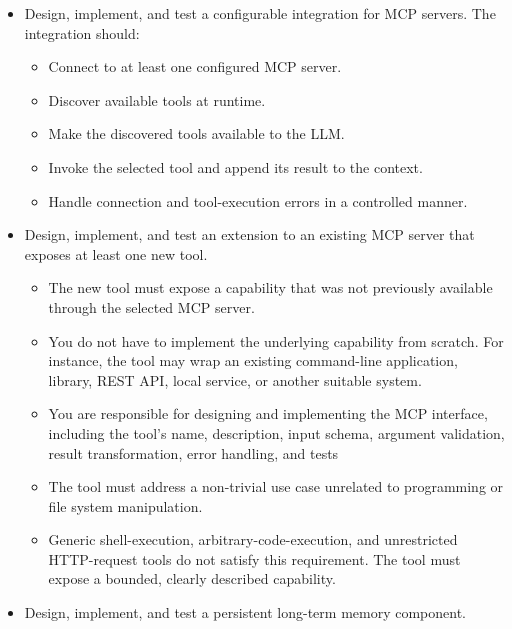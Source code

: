 \documentclass{article}
\begin{document}
\begin{itemize}
    \item Design, implement, and test a configurable integration for MCP servers. The integration should:
    \begin{itemize}
        \item Connect to at least one configured MCP server.
        \item Discover available tools at runtime.
        \item Make the discovered tools available to the LLM.
        \item Invoke the selected tool and append its result to the context.
        \item Handle connection and tool-execution errors in a controlled manner.
    \end{itemize}
    \item Design, implement, and test an extension to an existing MCP server that exposes at least one new tool.
    \begin{itemize}
        \item The new tool must expose a capability that was not previously available through the selected MCP server.
        \item You do not have to implement the underlying capability from scratch. For instance, the tool may wrap an existing command-line application, library, REST API, local service, or another suitable system.
        \item You are responsible for designing and implementing the MCP interface, including the tool's name, description, input schema, argument validation, result transformation, error handling, and tests
        \item The tool must address a non-trivial use case unrelated to programming or file system manipulation.
        \item Generic shell-execution, arbitrary-code-execution, and unrestricted HTTP-request tools do not satisfy this requirement. The tool must expose a bounded, clearly described capability.
    \end{itemize}
    \item Design, implement, and test a persistent long-term memory component.

\end{itemize}
\end{document}
